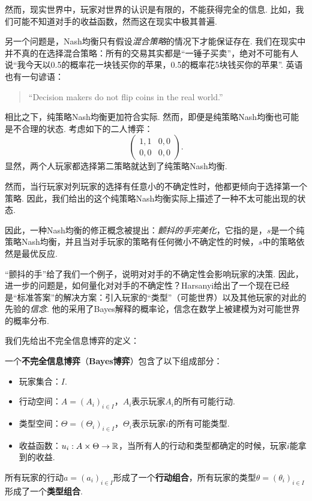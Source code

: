 然而，现实世界中，玩家对世界的认识是有限的，不能获得完全的信息. 比如，我们可能不知道对手的收益函数，然而这在现实中极其普遍. 

另一个问题是，Nash均衡只有假设\textit{混合策略}的情况下才能保证存在. 我们在现实中并不真的在选择混合策略：所有的交易其实都是“一锤子买卖”，绝对不可能有人说“我今天以0.5的概率花一块钱买你的苹果，0.5的概率花5块钱买你的苹果”. 英语也有一句谚语：
\begin{quotation}
“Decision makers do not flip coins in the real world.”
\end{quotation}

相比之下，纯策略Nash均衡更加符合实际. 然而，即便是纯策略Nash均衡也可能是不合理的状态. 考虑如下的二人博弈：
\[\begin{pmatrix}
1,1&0,0\\
0,0&0,0
\end{pmatrix}.\]
显然，两个人玩家都选择第二策略就达到了纯策略Nash均衡.

然而，当行玩家对列玩家的选择有任意小的不确定性时，他都更倾向于选择第一个策略. 因此，我们给出的这个纯策略Nash均衡实际上描述了一种不太可能出现的状态.

因此，一种Nash均衡的修正概念被提出：\textit{颤抖的手完美化}，它指的是，$s$是一个纯策略Nash均衡，并且当对手玩家的策略有任何微小不确定性的时候，$s$中的策略依然是最优反应.

“颤抖的手”给了我们一个例子，说明对对手的不确定性会影响玩家的决策. 因此，进一步的问题是，如何量化对对手的不确定性？Harsanyi给出了一个现在已经是“标准答案”的解决方案：引入玩家的“类型”（可能世界）以及其他玩家的对此的先验的\textit{信念}. 他的采用了Bayes解释的概率论，信念在数学上被建模为对可能世界的概率分布.

我们先给出不完全信息博弈的定义：

\begin{definition}
    一个\textbf{不完全信息博弈}（\textbf{Bayes博弈}）包含了以下组成部分：
\begin{itemize}
    \item 玩家集合：$I$.
    \item 行动空间：$A=(A_i)_{i\in I}$，$A_i$表示玩家$A_i$的所有可能行动.
    \item 类型空间：$\Theta=(\Theta_i)_{i\in I}$，$\Theta_i$表示玩家$i$的所有可能类型.
    \item 收益函数：$u_i:A\times\Theta\to\mathbb{R}$，当所有人的行动和类型都确定的时候，玩家$i$能拿到的收益.
\end{itemize}
所有玩家的行动$a=(a_i)_{i\in I}$形成了一个\textbf{行动组合}，所有玩家的类型$\theta=(\theta_i)_{i\in I}$形成了一个\textbf{类型组合}.
\end{definition}

